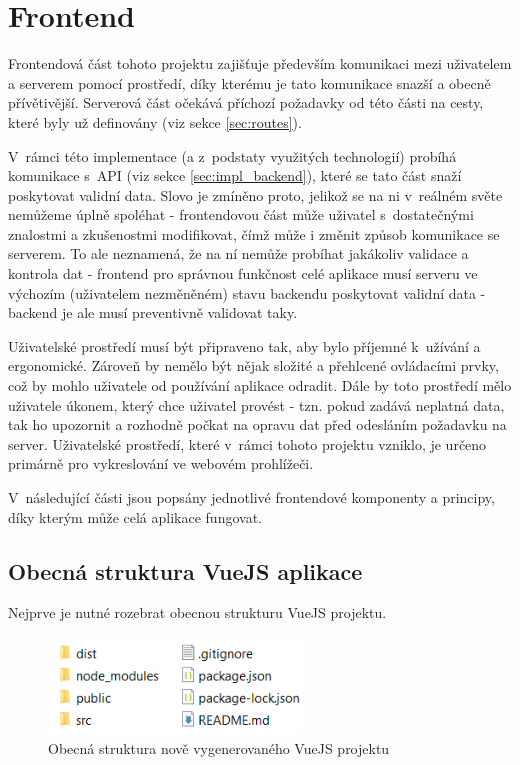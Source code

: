 \section{Frontend}\label{sec:impl_frontend}
Frontendová část tohoto projektu zajišťuje především komunikaci mezi uživatelem a serverem pomocí prostředí, díky kterému je tato komunikace snazší a obecně přívětivější. Serverová část očekává příchozí požadavky od této části na cesty, které byly už definovány (viz sekce \ref{sec:routes}).

V~rámci této implementace (a z~podstaty využitých technologií) probíhá komunikace s~API (viz sekce \ref{sec:impl_backend}), které se tato část snaží poskytovat validní data. Slovo  je zmíněno proto, jelikož se na ni v~reálném světe nemůžeme úplně spoléhat - frontendovou část může uživatel s~dostatečnými znalostmi a zkušenostmi modifikovat, čímž může i změnit způsob komunikace se serverem. To ale neznamená, že na ní nemůže probíhat jakákoliv validace a kontrola dat - frontend pro správnou funkčnost celé aplikace musí serveru ve výchozím (uživatelem nezměněném) stavu backendu poskytovat validní data - backend je ale musí preventivně validovat taky.

Uživatelské prostředí musí být připraveno tak, aby bylo příjemné k~užívání a ergonomické. Zároveň by nemělo být nějak složité a přehlcené ovládacími prvky, což by mohlo uživatele od používání aplikace odradit. Dále by toto prostředí mělo uživatele  úkonem, který chce uživatel provést - tzn. pokud zadává neplatná data, tak ho upozornit a rozhodně počkat na opravu dat před odesláním požadavku na server. Uživatelské prostředí, které v~rámci tohoto projektu vzniklo, je určeno primárně pro vykreslování ve webovém prohlížeči.

V~následující části jsou popsány jednotlivé frontendové komponenty a principy, díky kterým může celá aplikace fungovat.
	
	\subsection{Obecná struktura VueJS aplikace}\label{sec:obecna_str_vuejs}
	Nejprve je nutné rozebrat obecnou strukturu VueJS projektu.
	
	\begin{figure}[H]
		\centering
		\includegraphics[width=0.6\textwidth]{img/vuejs_struktura.png} 
		\caption{Obecná struktura nově vygenerovaného VueJS projektu}
		\label{fig:vuejs_str}
	\end{figure}

